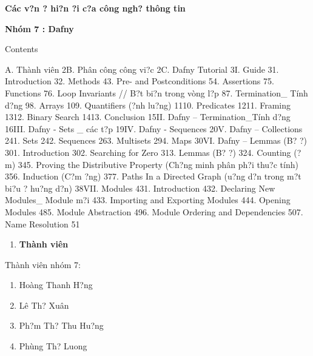 \documentclass{article} %
\begin{document}


\begin{tabular}{|p{1.4in}|p{1.4in}|p{1.4in}|} \hline 
 &  &  \\ \hline 
\end{tabular}



\begin{tabular}{|p{1.4in}|p{1.4in}|p{1.4in}|} \hline 
 &  &  \\ \hline 
\end{tabular}



\noindent \textbf{C\'{a}c v?n {\dj}? hi?n {\dj}?i c?a c\^{o}ng ngh? th\^{o}ng tin}

\noindent \textbf{Nh\'{o}m 7 : Dafny}

\noindent Contents 

\noindent A. Th\`{a}nh vi\^{e}n 2B. Ph\^{a}n c\^{o}ng c\^{o}ng vi?c 2C. Dafny Tutorial 3I. Guide 31. Introduction 32. Methods 43. Pre- and Postconditions 54. Assertions 75. Functions 76. Loop Invariants // B?t bi?n trong v\`{o}ng l?p 87. Termination\_ T\'{i}nh d?ng 98. Arrays 109. Quantifiers ({\dj}?nh lu?ng) 1110. Predicates 1211. Framing 1312. Binary Search 1413. Conclusion 15II. Dafny -- Termination\_T\'{i}nh d?ng 16III. Dafny - Sets \_ c\'{a}c t?p 19IV. Dafny - Sequences 20V. Dafny -- Collections 241. Sets 242. Sequences 263. Multisets 294. Maps 30VI. Dafny -- Lemmas (B? {\dj}?) 301. Introduction 302. Searching for Zero 313. Lemmas (B? {\dj}?) 324. Counting ({\DJ}?m) 345. Proving the Distributive Property (Ch?ng minh ph\^{a}n ph?i thu?c t\'{i}nh) 356. Induction (C?m ?ng) 377. Paths In a Directed Graph ({\dj}u?ng d?n trong m?t bi?u {\dj}? hu?ng d?n) 38VII. Modules 431. Introduction 432. Declaring New Modules\_ Module m?i 433. Importing and Exporting Modules 444. Opening Modules 485. Module Abstraction 496. Module Ordering and Dependencies 507. Name Resolution 51

\noindent 

\begin{enumerate}
\item  \textbf{Th\`{a}nh vi\^{e}n}
\end{enumerate}

\noindent Th\`{a}nh vi\^{e}n nh\'{o}m 7: 

\begin{enumerate}
\item  Ho\`{a}ng Thanh H?ng

\item  L\^{e} Th? Xu\^{a}n

\item  Ph?m Th? Thu Hu?ng

\item  Ph\`{u}ng Th? Luong
\end{enumerate}
\end{document}
